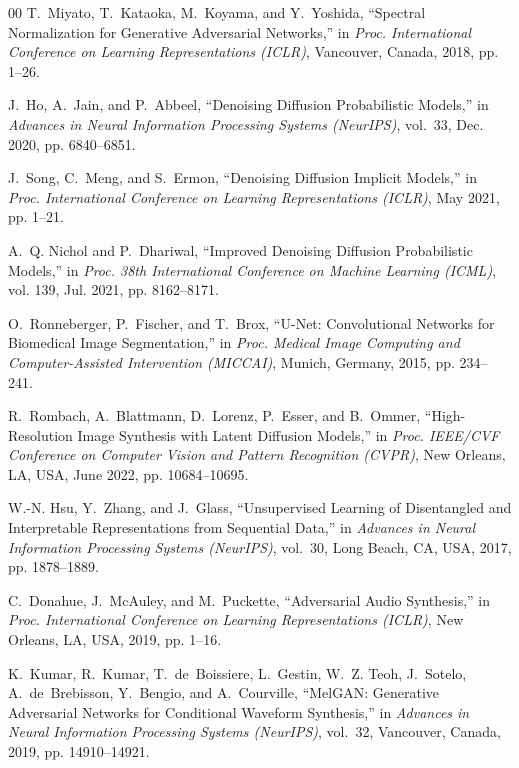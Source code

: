 \documentclass[conference]{IEEEtran}
\begin{document}
\begin{thebibliography}{00}
T.~Miyato, T.~Kataoka, M.~Koyama, and Y.~Yoshida, ``Spectral Normalization for Generative Adversarial Networks,'' in \emph{Proc. International Conference on Learning Representations (ICLR)}, Vancouver, Canada, 2018, pp. 1--26.

J.~Ho, A.~Jain, and P.~Abbeel, ``Denoising Diffusion Probabilistic Models,'' in \emph{Advances in Neural Information Processing Systems (NeurIPS)}, vol.~33, Dec. 2020, pp. 6840--6851.

J.~Song, C.~Meng, and S.~Ermon, ``Denoising Diffusion Implicit Models,'' in \emph{Proc. International Conference on Learning Representations (ICLR)}, May 2021, pp. 1--21.

A.~Q. Nichol and P.~Dhariwal, ``Improved Denoising Diffusion Probabilistic Models,'' in \emph{Proc. 38th International Conference on Machine Learning (ICML)}, vol. 139, Jul. 2021, pp. 8162--8171.

O.~Ronneberger, P.~Fischer, and T.~Brox, ``U-Net: Convolutional Networks for Biomedical Image Segmentation,'' in \emph{Proc. Medical Image Computing and Computer-Assisted Intervention (MICCAI)}, Munich, Germany, 2015, pp. 234--241.

R.~Rombach, A.~Blattmann, D.~Lorenz, P.~Esser, and B.~Ommer, ``High-Resolution Image Synthesis with Latent Diffusion Models,'' in \emph{Proc. IEEE/CVF Conference on Computer Vision and Pattern Recognition (CVPR)}, New Orleans, LA, USA, June 2022, pp. 10684--10695.

W.-N. Hsu, Y.~Zhang, and J.~Glass, ``Unsupervised Learning of Disentangled and Interpretable Representations from Sequential Data,'' in \emph{Advances in Neural Information Processing Systems (NeurIPS)}, vol.~30, Long Beach, CA, USA, 2017, pp. 1878--1889.

C.~Donahue, J.~McAuley, and M.~Puckette, ``Adversarial Audio Synthesis,'' in \emph{Proc. International Conference on Learning Representations (ICLR)}, New Orleans, LA, USA, 2019, pp. 1--16.

K.~Kumar, R.~Kumar, T.~de~Boissiere, L.~Gestin, W.~Z. Teoh, J.~Sotelo, A.~de~Brebisson, Y.~Bengio, and A.~Courville, ``MelGAN: Generative Adversarial Networks for Conditional Waveform Synthesis,'' in \emph{Advances in Neural Information Processing Systems (NeurIPS)}, vol.~32, Vancouver, Canada, 2019, pp. 14910--14921.


\end{thebibliography}
\end{document}
